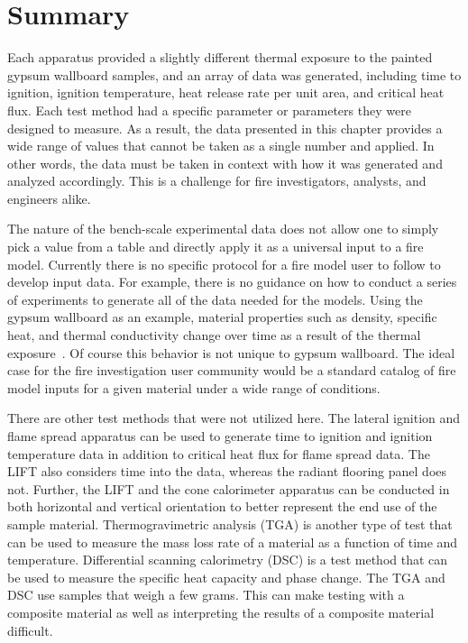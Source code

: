 \documentclass[twoside]{uocthesis}
\begin{document}
{\section{Summary}

Each apparatus provided a slightly different thermal exposure to the painted gypsum wallboard samples, and an array of data was generated, including time to ignition, ignition temperature, heat release rate per unit area, and critical heat flux.  Each test method had a specific parameter or parameters they were designed to measure. As a result, the data presented in this chapter provides a wide range of values that cannot be taken as a single number and applied.  In other words, the data must be taken in context with how it was generated and analyzed accordingly. This is a challenge for fire investigators, analysts, and engineers alike.  

The nature of the bench-scale experimental data does not allow one to simply pick a value from a table and directly apply it as a universal input to a fire model.   Currently there is no specific protocol for a fire model user to follow to develop input data.  For example, there is no guidance on how to conduct a series of experiments to generate all of the data needed for the models.  Using the gypsum wallboard as an example, material properties such as density, specific heat, and thermal conductivity change over time as a result of the thermal exposure~\cite{Schroeder:1999,McGraw:1999}.  Of course this behavior is not unique to gypsum wallboard. The ideal case for the fire investigation user community would be a standard catalog of fire model inputs for a given material under a wide range of conditions.

There are other test methods that were not utilized here.  The lateral ignition and flame spread apparatus can be used to generate time to ignition and ignition temperature data in addition to critical heat flux for flame spread data.  The LIFT also considers time into the data, whereas the radiant flooring panel does not.  Further, the LIFT and the cone calorimeter apparatus can be conducted in both horizontal and vertical orientation to better represent the end use of the sample material.  Thermogravimetric analysis (TGA) is another type of test that can be used to measure the mass loss rate of a material as a function of time and temperature.  Differential scanning calorimetry (DSC) is a test method that can be used to measure the specific heat capacity and phase change.  The TGA and DSC use samples that weigh a few grams.  This can make testing with a composite material as well as interpreting the results of a composite material difficult.   

}
\end{document}
